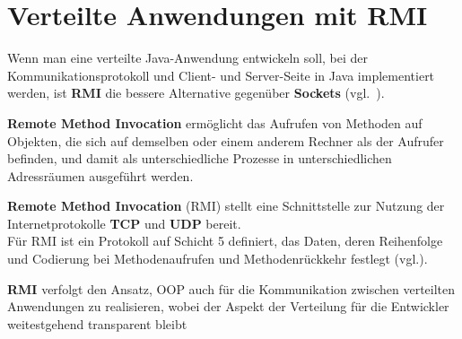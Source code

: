 \section{Verteilte Anwendungen mit RMI}

Wenn man eine verteilte Java-Anwendung entwickeln soll, bei der Kommunikationsprotokoll und Client- und Server-Seite in Java implementiert werden, ist \textbf{RMI} die bessere Alternative gegenüber  \textbf{Sockets} (vgl.~\cite[311]{Oec22}).\\


\begin{tcolorbox}
    \textbf{Remote Method Invocation} ermöglicht das Aufrufen von Methoden auf Objekten, die sich auf demselben oder einem anderem Rechner als der Aufrufer befinden, und damit als unterschiedliche Prozesse in unterschiedlichen Adressräumen ausgeführt werden.
\end{tcolorbox}

\noindent
\textbf{Remote Method Invocation} (RMI) stellt eine Schnittstelle zur Nutzung der Internetprotokolle \textbf{TCP} und \textbf{UDP} bereit.\\
Für RMI ist ein Protokoll auf Schicht 5 definiert, das Daten, deren Reihenfolge und Codierung bei Methodenaufrufen und Methodenrückkehr festlegt (vgl.\cite[402]{Oec22}).

\noindent
\textbf{RMI} verfolgt den Ansatz, OOP auch für die Kommunikation zwischen verteilten Anwendungen zu realisieren, wobei der Aspekt der Verteilung für die Entwickler weitestgehend transparent bleibt

